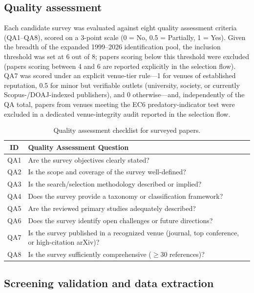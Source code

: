 \documentclass[a4paper,fleqn]{cas-sc}
\begin{document}
\subsection{Quality assessment}
\label{subsec:quality}

Each candidate survey was evaluated against eight quality assessment criteria (QA1--QA8), scored on a 3-point scale (0 = No, 0.5 = Partially, 1 = Yes). Given the breadth of the expanded 1999--2026 identification pool, the inclusion threshold was set at 6 out of 8; papers scoring below this threshold were excluded (papers scoring between 4 and 6 are reported explicitly in the selection flow). QA7 was scored under an explicit venue-tier rule---1 for venues of established reputation, 0.5 for minor but verifiable outlets (university, society, or currently Scopus-/DOAJ-indexed publishers), and 0 otherwise---and, independently of the QA total, papers from venues meeting the EC6 predatory-indicator test were excluded in a dedicated venue-integrity audit reported in the selection flow.

\begin{table}[H]
\centering
\caption{Quality assessment checklist for surveyed papers.}
\label{tab:qa}
\small
\begin{tabular}{c p{10cm}}
\toprule
\textbf{ID} & \textbf{Quality Assessment Question} \\
\midrule
QA1 & Are the survey objectives clearly stated? \\
QA2 & Is the scope and coverage of the survey well-defined? \\
QA3 & Is the search/selection methodology described or implied? \\
QA4 & Does the survey provide a taxonomy or classification framework? \\
QA5 & Are the reviewed primary studies adequately described? \\
QA6 & Does the survey identify open challenges or future directions? \\
QA7 & Is the survey published in a recognized venue (journal, top conference, or high-citation arXiv)? \\
QA8 & Is the survey sufficiently comprehensive ($\geq$30 references)? \\
\bottomrule
\end{tabular}
\end{table}

\subsection{Screening validation and data extraction}
\label{subsec:validation}
\end{document}
